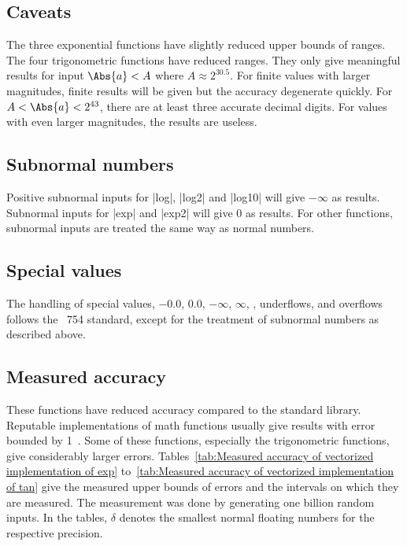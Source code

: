 \subsection{Caveats}
\label{sub:Caveats}

The three exponential functions have slightly reduced upper bounds of ranges.
The four trigonometric functions have reduced ranges. They only give meaningful
results for input $\Abs{a} < A$ where $A \approx 2^{30.5}$. For finite values
with larger magnitudes, finite results will be given but the accuracy
degenerate quickly. For $A < \Abs{a} < 2^{43}$, there are at least three
accurate decimal digits. For values with even larger magnitudes, the results
are useless.

\subsection{Subnormal numbers}
\label{sub:Subnormal numbers}

Positive subnormal inputs for |log|, |log2| and |log10| will give $-\infty$ as
results. Subnormal inputs for |exp| and |exp2| will give $0$ as results. For
other functions, subnormal inputs are treated the same way as normal numbers.

\subsection{Special values}
\label{sub:Special values}

The handling of special values, $-0.0$, $0.0$, $-\infty$, $\infty$, \nan,
underflows, and overflows follows the \ieee~754 standard, except for the
treatment of subnormal numbers as described above.

\subsection{Measured accuracy}
\label{sub:Measured accuracy}

These functions have reduced accuracy compared to the standard library.
Reputable implementations of math functions usually give results with error
bounded by 1~\ulp. Some of these functions, especially the trigonometric
functions, give considerably larger errors. Tables~\ref{tab:Measured accuracy
  of vectorized implementation of exp} to~\ref{tab:Measured accuracy of
  vectorized implementation of tan} give the measured upper bounds of errors
and the intervals on which they are measured. The measurement was done by
generating one billion random inputs. In the tables, $\delta$ denotes the
smallest normal floating numbers for the respective precision.

